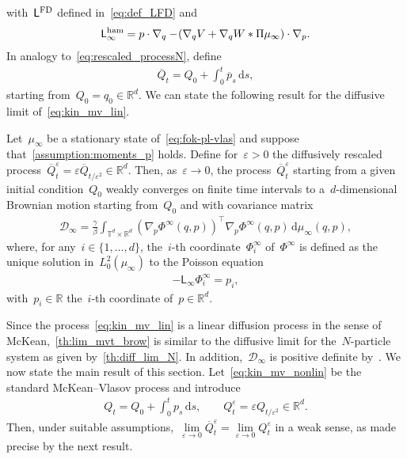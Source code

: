 \documentclass[onefignum,onetabnum]{siamart251216} %
\renewcommand{\d}{\mathrm{d}}
\newcommand{\torus}{\mathbb T}
\newcommand{\real}{\mathbb R}
\newcommand{\mc}[1]{\mathcal{#1}}
\newcommand{\mescin}{\mu}
\newcommand{\projp}{\Pi}
\newcommand{\genlin}{\mathsf{L}_\infty}
\newcommand{\Lham}{\mathsf{L}^{\rm{ham}}}
\newcommand{\LFD}{\mathsf{L}^{\rm{FD}}}
\newcommand{\eps}{\varepsilon}
\newcommand{\SolPois}{\Phi^\infty}
\theoremstyle{plain}
\numberwithin{equation}{section}
\numberwithin{theorem}{section}
\begin{document}
with~$\LFD$ defined in~\eqref{eq:def_LFD} and
\begin{align}
    \Lham_\infty = p\cdot \nabla_q - \!\left(\nabla_q V + \nabla_q W * \projp\mescin_\infty\right) \cdot \nabla_p.
\end{align}
In analogy to~\eqref{eq:rescaled_processN}, define
\begin{align*}
    \overline{Q}_t = Q_0 +\int_0^{t} \overline{p}_s \,\d s,
\end{align*}
starting from~$Q_0 = q_0 \in \real^d$. We can state the following result for the diffusive limit of~\eqref{eq:kin_mv_lin}.
\begin{theorem}
    \label{th:lim_mvt_brow}
Let~$\mescin_\infty$ be a stationary state of~\eqref{eq:fok-pl-vlas} and suppose that~\cref{assumption:moments_p} holds. Define for~$\eps>0$ the diffusively rescaled process~$\overline{Q}_t^{\eps} = \eps \overline{Q}_{t/\eps^2} \in \real^d$. Then, as~$\eps \rightarrow 0$, the process~$\overline{Q}_t^{\eps}$ starting from a given initial condition~$Q_0$ weakly converges on finite time intervals to a~$d$-dimensional Brownian motion starting from~$Q_0$ and with covariance matrix
\begin{align}
    \label{eq:cov_mat_diff}
    \mc{D}_\infty = \frac{\gamma}{\beta}\int_{\torus^d \times \real^d} (\nabla_p \SolPois(q,p))^\top \nabla_p \SolPois(q,p) \, \d\mescin_{\infty}(q,p),
\end{align}
where, for any~$i \in\{1,\dots, d\}$, the~$i$-th coordinate~$\SolPois_i$ of~$\SolPois$ is defined as the unique solution in~$L^2_0(\mescin_\infty)$ to the Poisson equation
\begin{align}
    \label{eq:sol_poisson_MV_lin}
    -\genlin \SolPois_i = p_i,
\end{align}
with~$p_i \in \real$ the~$i$-th coordinate of~$p \in \real^d$.
\end{theorem}
Since the process~\eqref{eq:kin_mv_lin} is a linear diffusion process in the sense of McKean,~\cref{th:lim_mvt_brow} is similar to the diffusive limit for the~$N$-particle system as given by~\cref{th:diff_lim_N}. In addition,~$\mc{D}_\infty$ is positive definite by~\cite[Lemma 6.11]{PavliotisStochasticProcesses2014}.
We now state the main result of this section. Let~\eqref{eq:kin_mv_nonlin} be the standard McKean--Vlasov process and introduce
\begin{align}
    \label{eq:integrated_McKV}
    Q_t = Q_0 +\int_0^{t}p_s \,\d s,\qquad Q_t^{\eps} = \eps Q_{t/\eps^2} \in \real^d.
\end{align}
Then, under suitable assumptions,~$\lim\limits_{\eps \rightarrow 0} \overline{Q}_t^\eps = \lim\limits_{\eps \rightarrow 0} Q_t^\eps$ in a weak sense, as made precise by the next result.
\end{document}
